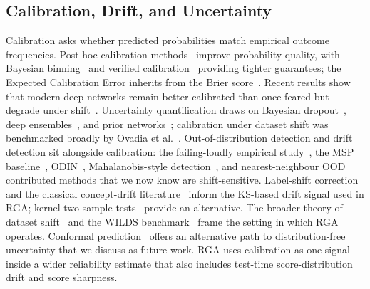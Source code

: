\documentclass[10pt,conference]{IEEEtran}
\newcommand{\method}{RGA}
\begin{document}
\subsection{Calibration, Drift, and Uncertainty}
Calibration asks whether predicted probabilities match empirical outcome
frequencies. Post-hoc calibration methods~\cite{zadrozny2002transforming,
guo2017calibration,platt1999probabilistic,zadrozny2001obtaining,kull2017beta,kuleshov2018accurate}
improve probability quality, with Bayesian binning~\cite{naeini2015obtaining}
and verified calibration~\cite{kumar2019verified} providing tighter guarantees;
the Expected Calibration Error inherits from the Brier
score~\cite{brier1950verification}. Recent results show that modern deep
networks remain better calibrated than once feared but degrade under
shift~\cite{minderer2021revisiting}. Uncertainty quantification draws on
Bayesian dropout~\cite{gal2016dropout}, deep
ensembles~\cite{lakshminarayanan2017simple}, and prior
networks~\cite{malinin2018predictive}; calibration under dataset shift was
benchmarked broadly by Ovadia et al.~\cite{ovadia2019can}. Out-of-distribution
detection and drift detection sit alongside calibration: the failing-loudly
empirical study~\cite{rabanser2019failing}, the MSP
baseline~\cite{hendrycks2017baseline},
ODIN~\cite{liang2018odin}, Mahalanobis-style
detection~\cite{lee2018simple}, and nearest-neighbour
OOD~\cite{sun2022out} contributed methods that we now know are
shift-sensitive. Label-shift correction~\cite{lipton2018detecting} and the
classical concept-drift literature~\cite{gama2014survey,bifet2007adwin,page1954hinkley}
inform the KS-based drift signal used in \method{}; kernel two-sample
tests~\cite{gretton2012kernel} provide an alternative. The broader theory of
dataset shift~\cite{quinonero2009dataset,moreno2012unifying,sugiyama2017dataset,shimodaira2000improving}
and the WILDS benchmark~\cite{koh2021wilds} frame the setting in which
\method{} operates. Conformal
prediction~\cite{vovk2005algorithmic,shafer2008tutorial,romano2019conformalized}
offers an alternative path to distribution-free uncertainty that we discuss
as future work. \method{} uses calibration as one signal inside a wider
reliability estimate that also includes test-time score-distribution drift
and score sharpness.
\end{document}
